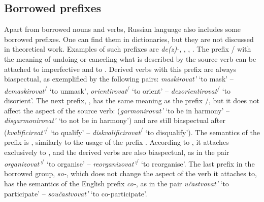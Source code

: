 \subsection{Borrowed prefixes}\label{subsection:perf:prefixes}
%
%
%
Apart from borrowed nouns and verbs, Russian language also includes some borrowed prefixes.  One can find them in dictionaries, but they are not discussed in theoretical work. Examples of such prefixes are \textit{de(z)-}, , , . The prefix / with the meaning of undoing or canceling what is described by the source verb can be attached to imperfective and to . Derived verbs with this prefix are always biaspectual, as exemplified by the following pairs: \textit{maskirovat'}\textsuperscript{\IPF} `to mask' -- \textit{demaskirovat}\textsuperscript{\IPF\slash\PF} `to unmask', \textit{orientirovat}\textsuperscript{\IPF\slash\PF} `to orient' -- \textit{dezorientirovat}\textsuperscript{\IPF\slash\PF} `to disorient'. The next prefix, , has the same meaning as the prefix /, but it does not affect the aspect of the source verb:   (\textit{garmonirovat'}\textsuperscript{\IPF} `to be in harmony' -- \textit{disgarmonirovat'}\textsuperscript{\IPF} `to not be in harmony') and  are still biaspectual after  (\textit{kvalificirvat'}\textsuperscript{\IPF\slash\PF} `to qualify' -- \textit{diskvalificirovat}\textsuperscript{\IPF\slash\PF} `to disqualify'). The semantics of the prefix  is , similarly to the  usage of the prefix . According to \citet[369]{Shvedova:82}, it attaches exclusively to , and the derived verbs are also biaspectual, as in the pair \textit{organizovat'}\textsuperscript{\IPF\slash\PF}  `to organise' -- \textit{reorganizovat'}\textsuperscript{\IPF\slash\PF}  `to reorganise'. The last prefix in the borrowed group, \textit{so-}, which does not change the aspect of the verb it attaches to, has the semantics of the English prefix \textit{co-}, as in the pair  \textit{u\v{c}astvovat'}\textsuperscript{\IPF}  `to participate' -- \textit{sou\v{c}astvovat'}\textsuperscript{\IPF}  `to co-participate'.

